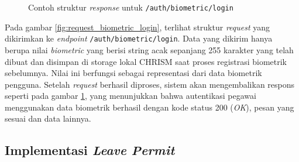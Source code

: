 \begin{figure}
    \centering
    \caption{Contoh struktur \textit{response} untuk \texttt{/auth/biometric/login}}
    \label{fig:response_biometric_login}
\end{figure}

Pada gambar \ref{fig:request_biometric_login}, terlihat struktur \textit{request} yang dikirimkan ke \textit{endpoint} \texttt{/auth/biometric/login}. Data yang dikirim hanya berupa nilai \textit{biometric} yang berisi string acak sepanjang 255 karakter yang telah dibuat dan disimpan di storage lokal CHRISM saat proses registrasi biometrik sebelumnya. Nilai ini berfungsi sebagai representasi dari data biometrik pengguna. Setelah \textit{request} berhasil diproses, sistem akan mengembalikan respons seperti pada gambar \ref{fig:response_biometric_login}, yang menunjukkan bahwa autentikasi pegawai menggunakan data biometrik berhasil dengan kode status 200 (\textit{OK}), pesan yang sesuai dan data lainnya.


\subsection{Implementasi \textit{Leave Permit}}
